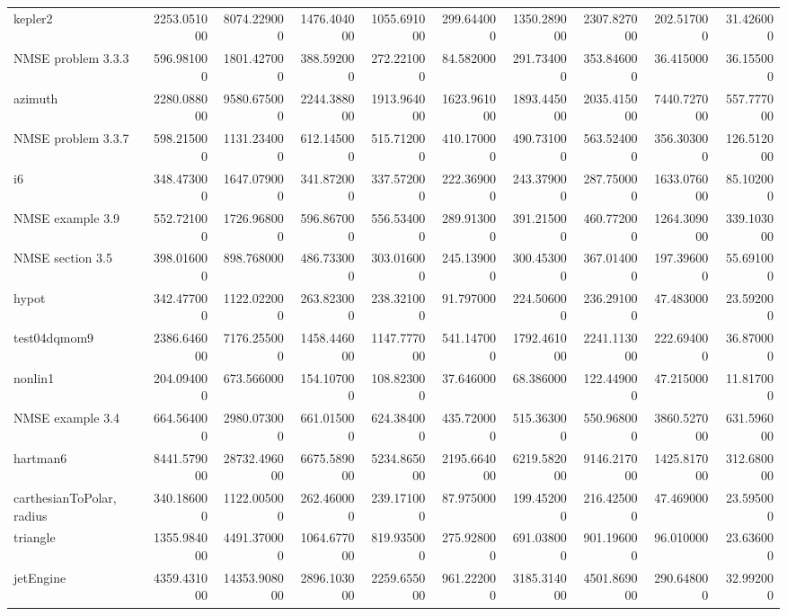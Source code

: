 \begin{longtable}{lrrrrrrrrr}
kepler2 & 2253.051000 & 8074.229000 & 1476.404000 & 1055.691000 & 299.644000 & 1350.289000 & 2307.827000 & 202.517000 & 31.426000 \\
NMSE problem 3.3.3 & 596.981000 & 1801.427000 & 388.592000 & 272.221000 & 84.582000 & 291.734000 & 353.846000 & 36.415000 & 36.155000 \\
azimuth & 2280.088000 & 9580.675000 & 2244.388000 & 1913.964000 & 1623.961000 & 1893.445000 & 2035.415000 & 7440.727000 & 557.777000 \\
NMSE problem 3.3.7 & 598.215000 & 1131.234000 & 612.145000 & 515.712000 & 410.170000 & 490.731000 & 563.524000 & 356.303000 & 126.512000 \\
i6 & 348.473000 & 1647.079000 & 341.872000 & 337.572000 & 222.369000 & 243.379000 & 287.750000 & 1633.076000 & 85.102000 \\
NMSE example 3.9 & 552.721000 & 1726.968000 & 596.867000 & 556.534000 & 289.913000 & 391.215000 & 460.772000 & 1264.309000 & 339.103000 \\
NMSE section 3.5 & 398.016000 & 898.768000 & 486.733000 & 303.016000 & 245.139000 & 300.453000 & 367.014000 & 197.396000 & 55.691000 \\
hypot & 342.477000 & 1122.022000 & 263.823000 & 238.321000 & 91.797000 & 224.506000 & 236.291000 & 47.483000 & 23.592000 \\
test04dqmom9 & 2386.646000 & 7176.255000 & 1458.446000 & 1147.777000 & 541.147000 & 1792.461000 & 2241.113000 & 222.694000 & 36.870000 \\
nonlin1 & 204.094000 & 673.566000 & 154.107000 & 108.823000 & 37.646000 & 68.386000 & 122.449000 & 47.215000 & 11.817000 \\
NMSE example 3.4 & 664.564000 & 2980.073000 & 661.015000 & 624.384000 & 435.720000 & 515.363000 & 550.968000 & 3860.527000 & 631.596000 \\
hartman6 & 8441.579000 & 28732.496000 & 6675.589000 & 5234.865000 & 2195.664000 & 6219.582000 & 9146.217000 & 1425.817000 & 312.680000 \\
carthesianToPolar, radius & 340.186000 & 1122.005000 & 262.460000 & 239.171000 & 87.975000 & 199.452000 & 216.425000 & 47.469000 & 23.595000 \\
triangle & 1355.984000 & 4491.370000 & 1064.677000 & 819.935000 & 275.928000 & 691.038000 & 901.196000 & 96.010000 & 23.636000 \\
jetEngine & 4359.431000 & 14353.908000 & 2896.103000 & 2259.655000 & 961.222000 & 3185.314000 & 4501.869000 & 290.648000 & 32.992000 \\

\end{longtable}

